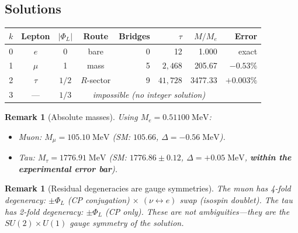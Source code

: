\documentclass[11pt]{article}
\newtheorem{remark}[theorem]{Remark}
\begin{document}
\subsection{Solutions}

\begin{center}
\renewcommand{\arraystretch}{1.3}
\begin{tabular}{ccccrrrr}
\toprule
$k$ & Lepton & $|\Phi_L|$ & Route & Bridges &
$\tau$ & $M/M_e$ & Error \\
\midrule
0 & $e$ & 0 & bare & 0 &
  12 & 1.000 & exact \\
1 & $\mu$ & 1 & mass & 5 &
  $2{,}468$ & 205.67 & $-0.53\%$ \\
2 & $\tau$ & $1/2$ & $R$-sector & 9 &
  $41{,}728$ & 3477.33 & $+0.003\%$ \\
3 & --- & $1/3$ & \multicolumn{4}{c}{\emph{impossible
  (no integer solution)}} \\
\bottomrule
\end{tabular}
\end{center}

\begin{remark}[Absolute masses]
\label{rem:abs-masses}
Using $M_e = 0.51100\;\mathrm{MeV}$:
\begin{itemize}
\item Muon: $M_\mu = 105.10\;\mathrm{MeV}$
  (SM: $105.66$, $\Delta = -0.56\;\mathrm{MeV}$).
\item Tau: $M_\tau = 1776.91\;\mathrm{MeV}$
  (SM: $1776.86 \pm 0.12$, $\Delta = +0.05\;\mathrm{MeV}$,
  \textbf{within the experimental error bar}).
\end{itemize}
\end{remark}

\begin{remark}[Residual degeneracies are gauge symmetries]
\label{rem:degen}
The muon has 4-fold degeneracy: $\pm\Phi_L$ (CP conjugation)
$\times$ $(\nu \leftrightarrow e)$ swap (isospin doublet).
The tau has 2-fold degeneracy: $\pm\Phi_L$ (CP only).
These are not ambiguities---they are the $SU(2) \times U(1)$
gauge symmetry of the solution.
\end{remark}
\end{document}
